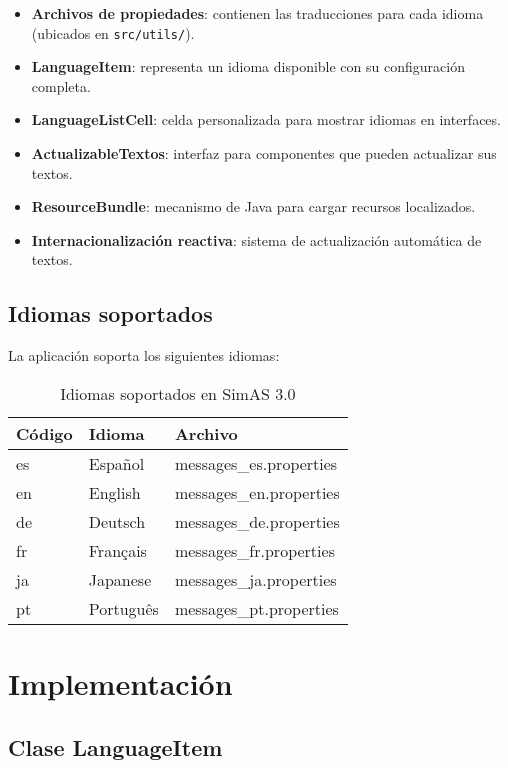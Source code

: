 \begin{itemize}
    \item \textbf{Archivos de propiedades}: contienen las traducciones para cada idioma (ubicados en \texttt{src/utils/}).
    \item \textbf{LanguageItem}: representa un idioma disponible con su configuración completa.
    \item \textbf{LanguageListCell}: celda personalizada para mostrar idiomas en interfaces.
    \item \textbf{ActualizableTextos}: interfaz para componentes que pueden actualizar sus textos.
    \item \textbf{ResourceBundle}: mecanismo de Java para cargar recursos localizados.
    \item \textbf{Internacionalización reactiva}: sistema de actualización automática de textos.
\end{itemize}

\subsection{Idiomas soportados}

La aplicación soporta los siguientes idiomas:

\begin{table}[H]
\centering
\begin{tabular}{|l|l|l|}
\hline
\textbf{Código} & \textbf{Idioma} & \textbf{Archivo} \\
\hline
es & Español & messages\_es.properties \\
\hline
en & English & messages\_en.properties \\
\hline
de & Deutsch & messages\_de.properties \\
\hline
fr & Français & messages\_fr.properties \\
\hline
ja & Japanese & messages\_ja.properties \\
\hline
pt & Português & messages\_pt.properties \\
\hline
\end{tabular}
\caption{Idiomas soportados en SimAS 3.0}
\label{tab:idiomas-soportados}
\end{table}

\section{Implementación}

\subsection{Clase LanguageItem}

